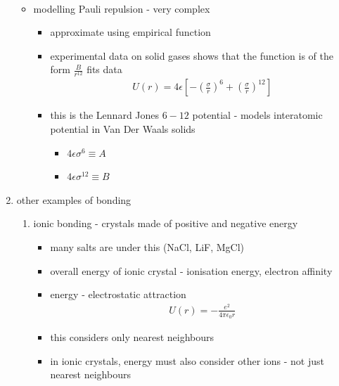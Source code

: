 \documentclass[a4paper,11pt,normalem]{article}
\begin{document}
\begin{enumerate}
\begin{itemize}
\begin{itemize}
\begin{align*}
                        \end{align*}
                \end{itemize}
            \item modelling Pauli repulsion - very complex
                \begin{itemize}
                    \item approximate using empirical function
                    \item experimental data on solid gases shows that the function is of the form \(\frac{B}{r^{12}}\) fits data
                        \begin{align*}
                            U(r) = 4\epsilon\left[-\left(\frac{\sigma}{r}\right)^6 + \left(\frac{\sigma}{r}\right)^{12}\right]
                        \end{align*}
                    \item this is the Lennard Jones \(6-12\) potential - models interatomic potential in Van Der Waals solids
                        \begin{itemize}
                            \item \(4\epsilon\sigma^6 \equiv A\)
                            \item \(4\epsilon\sigma^{12} \equiv B\)
                        \end{itemize}
                \end{itemize}
        \end{itemize}
    \item other examples of bonding
        \begin{enumerate}
            \item ionic bonding - crystals made of positive and negative energy
                \begin{itemize}
                    \item many salts are under this (NaCl, LiF, MgCl)
                    \item overall energy of ionic crystal - ionisation energy, electron affinity
                    \item energy - electrostatic attraction
                        \begin{align*}
                            U(r) = -\frac{e^2}{4\pi\epsilon_0 r}
                        \end{align*}
                    \item this considers only nearest neighbours
                    \item in ionic crystals, energy must also consider other ions - not just nearest neighbours

\end{itemize}
\end{enumerate}
\end{enumerate}
\end{document}
